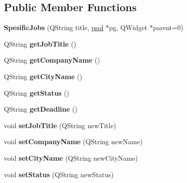 \subsection*{Public Member Functions}
\begin{DoxyCompactItemize}
\item 
\mbox{\label{class_spesific_jobs_a382c130bb70f2bf25c76ef5c720659d6}} 
{\bfseries Spesific\+Jobs} (Q\+String title, \hyperlink{classpsql}{psql} $\ast$pg, Q\+Widget $\ast$parent=0)
\item 
\mbox{\label{class_spesific_jobs_afe77ad902d3e9f3cfd5f057e0a37a193}} 
Q\+String {\bfseries get\+Job\+Title} ()
\item 
\mbox{\label{class_spesific_jobs_a51afafde9872e78e8b09e3bc00a2a161}} 
Q\+String {\bfseries get\+Company\+Name} ()
\item 
\mbox{\label{class_spesific_jobs_a39390d9c54635a2dc60c80322a7b42ed}} 
Q\+String {\bfseries get\+City\+Name} ()
\item 
\mbox{\label{class_spesific_jobs_aefe905d920961199fec0aff37a34b50d}} 
Q\+String {\bfseries get\+Status} ()
\item 
\mbox{\label{class_spesific_jobs_a4744022c02271fabfb7fca0015896c09}} 
Q\+String {\bfseries get\+Deadline} ()
\item 
\mbox{\label{class_spesific_jobs_abb4d8e45e0a2be8197ef03057fc5c714}} 
void {\bfseries set\+Job\+Title} (Q\+String new\+Title)
\item 
\mbox{\label{class_spesific_jobs_aeacc56572911219fddf2f1439a70ed74}} 
void {\bfseries set\+Company\+Name} (Q\+String new\+Name)
\item 
\mbox{\label{class_spesific_jobs_a67b162aa9ad12ed8ffba061edff96cdf}} 
void {\bfseries set\+City\+Name} (Q\+String new\+City\+Name)
\item 
\mbox{\label{class_spesific_jobs_a439307a28196221b7e3877983077812f}} 
void {\bfseries set\+Status} (Q\+String new\+Status)

\end{DoxyCompactItemize}
